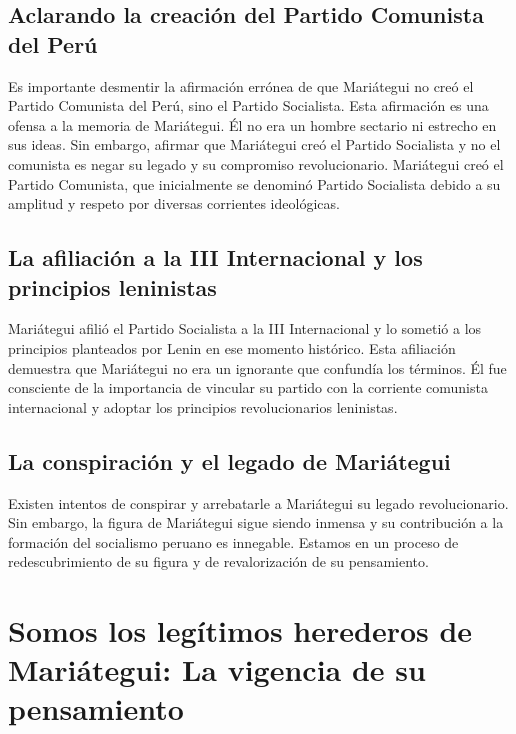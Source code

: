 \documentclass[
  letterpaper,
  DIV=11,
  numbers=noendperiod]{scrartcl}
\begin{document}
\hypertarget{aclarando-la-creaciuxf3n-del-partido-comunista-del-peruxfa}{%
\subsection{Aclarando la creación del Partido Comunista del
Perú}\label{aclarando-la-creaciuxf3n-del-partido-comunista-del-peruxfa}}

Es importante desmentir la afirmación errónea de que Mariátegui no creó
el Partido Comunista del Perú, sino el Partido Socialista. Esta
afirmación es una ofensa a la memoria de Mariátegui. Él no era un hombre
sectario ni estrecho en sus ideas. Sin embargo, afirmar que Mariátegui
creó el Partido Socialista y no el comunista es negar su legado y su
compromiso revolucionario. Mariátegui creó el Partido Comunista, que
inicialmente se denominó Partido Socialista debido a su amplitud y
respeto por diversas corrientes ideológicas.

\hypertarget{la-afiliaciuxf3n-a-la-iii-internacional-y-los-principios-leninistas}{%
\subsection{La afiliación a la III Internacional y los principios
leninistas}\label{la-afiliaciuxf3n-a-la-iii-internacional-y-los-principios-leninistas}}

Mariátegui afilió el Partido Socialista a la III Internacional y lo
sometió a los principios planteados por Lenin en ese momento histórico.
Esta afiliación demuestra que Mariátegui no era un ignorante que
confundía los términos. Él fue consciente de la importancia de vincular
su partido con la corriente comunista internacional y adoptar los
principios revolucionarios leninistas.

\hypertarget{la-conspiraciuxf3n-y-el-legado-de-mariuxe1tegui}{%
\subsection{La conspiración y el legado de
Mariátegui}\label{la-conspiraciuxf3n-y-el-legado-de-mariuxe1tegui}}

Existen intentos de conspirar y arrebatarle a Mariátegui su legado
revolucionario. Sin embargo, la figura de Mariátegui sigue siendo
inmensa y su contribución a la formación del socialismo peruano es
innegable. Estamos en un proceso de redescubrimiento de su figura y de
revalorización de su pensamiento.

\hypertarget{somos-los-leguxedtimos-herederos-de-mariuxe1tegui-la-vigencia-de-su-pensamiento}{%
\section{Somos los legítimos herederos de Mariátegui: La vigencia de su
pensamiento}\label{somos-los-leguxedtimos-herederos-de-mariuxe1tegui-la-vigencia-de-su-pensamiento}}
\end{document}

